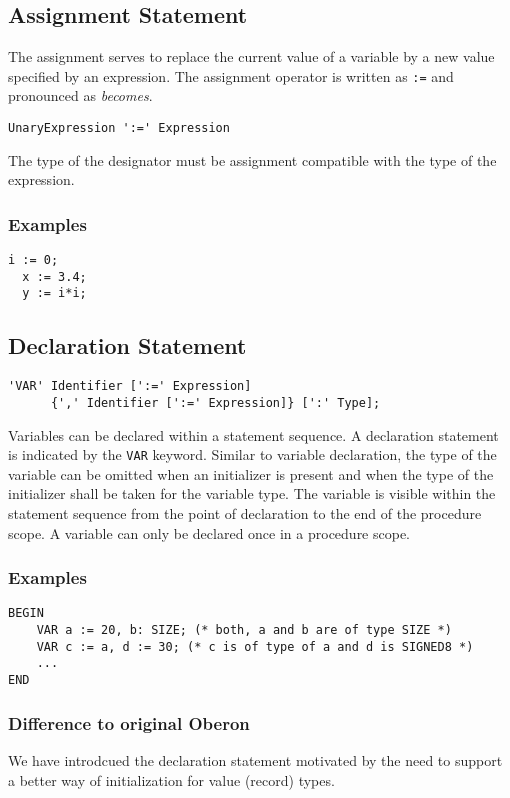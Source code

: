 \documentclass[a4wide,11pt]{article}
\begin{document}
\subsection{Assignment Statement}
The assignment serves to replace the current value of a variable by a new value specified by an expression.
The assignment operator is written as \lstinline":="  and pronounced as \emph{becomes}.

\begin{lstlisting}[style=ebnf]
	UnaryExpression ':=' Expression
\end{lstlisting}

The type of the designator must be assignment compatible with the type of the expression.

\begin{annotation}
\subsubsection{Examples}
\begin{lstlisting}[style=example,caption=Examples of Assignments]
  i := 0;
  x := 3.4;
  y := i*i;
\end{lstlisting}
\end{annotation}

\subsection{Declaration Statement}
\begin{lstlisting}[style=ebnf]
'VAR' Identifier [':=' Expression] 
      {',' Identifier [':=' Expression]} [':' Type];
\end{lstlisting}

Variables can be declared within a statement sequence. A declaration statement is indicated by the \lstinline"VAR" keyword. Similar to variable declaration, the type of the variable can be omitted when an initializer is present and when the type of the initializer shall be taken for the variable type. The variable is visible within the statement sequence from the point of declaration to the end of the procedure scope. A variable can only be declared once in a procedure scope. 

\begin{annotation}
\subsubsection{Examples}
\begin{lstlisting}[style=example]
BEGIN
	VAR a := 20, b: SIZE; (* both, a and b are of type SIZE *)
	VAR c := a, d := 30; (* c is of type of a and d is SIGNED8 *)
	...
END
\end{lstlisting}

\subsubsection{Difference to original Oberon}
We have introdcued the declaration statement motivated by the need to support a better way of initialization for value (record) types.
\end{annotation}
\end{document}

